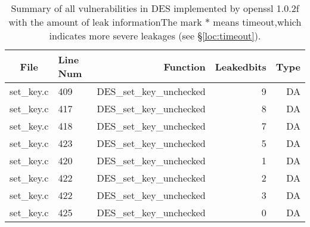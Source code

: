 \begin{table}%
\centering\tiny
\caption{Summary of all vulnerabilities in DES implemented by openssl 1.0.2f with the amount of leak informationThe mark $*$ means timeout,which indicates more severe leakages (see \S\ref{loc:timeout}).}\label{tab:DESopenssl}
\begin{tabular}{clrrr}
\hline
\textbf{File} & \textbf{Line Num} & \textbf{Function} & \textbf{Leakedbits} & \textbf{Type} \\\hline
set\_key.c& 409&DES\_set\_key\_unchecked&9 &DA\\
set\_key.c& 417&DES\_set\_key\_unchecked&8 &DA\\
set\_key.c& 418&DES\_set\_key\_unchecked&7 &DA\\
set\_key.c& 423&DES\_set\_key\_unchecked&5 &DA\\
set\_key.c& 420&DES\_set\_key\_unchecked&1 &DA\\
set\_key.c& 422&DES\_set\_key\_unchecked&2 &DA\\
set\_key.c& 422&DES\_set\_key\_unchecked&3 &DA\\
set\_key.c& 425&DES\_set\_key\_unchecked&0 &DA\\
\hline
\end{tabular}
\end{table}